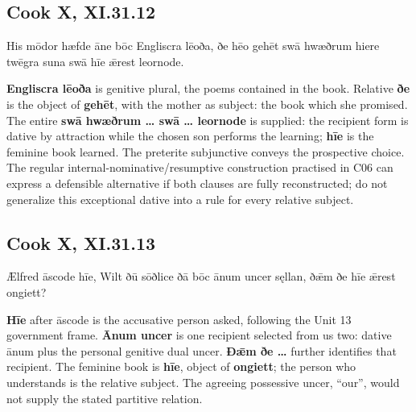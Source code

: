 \subsection*{Cook X, XI.31.12}

\par\begin{minipage}{\linewidth}\raggedright
His mōdor hæfde āne bōc Engliscra lēoða, ðe hēo gehēt swā hwæðrum hiere twēgra suna swā hīe ǣrest leornode.

\textbf{Engliscra lēoða} is genitive plural, the poems contained in the book. Relative \textbf{ðe} is the object of \textbf{gehēt}, with the mother as subject: the book which she promised. The entire \textbf{swā hwæðrum … swā … leornode} is supplied: the recipient form is dative by attraction while the chosen son performs the learning; \textbf{hīe} is the feminine book learned. The preterite subjunctive conveys the prospective choice. The regular internal-nominative/\allowbreak{}resumptive construction practised in C06 can express a defensible alternative if both clauses are fully reconstructed; do not generalize this exceptional dative into a rule for every relative subject.

\end{minipage}\par\addvspace{4pt}

\subsection*{Cook X, XI.31.13}

\par\begin{minipage}{\linewidth}\raggedright
Ælfred āscode hīe, Wilt ðū sōðlice ðā bōc ānum uncer sęllan, ðǣm ðe hīe ǣrest ongiett?

\textbf{Hīe} after āscode is the accusative person asked, following the Unit 13 government frame. \textbf{Ānum uncer} is one recipient selected from us two: dative ānum plus the personal genitive dual uncer. \textbf{Ðǣm ðe …} further identifies that recipient. The feminine book is \textbf{hīe}, object of \textbf{ongiett}; the person who understands is the relative subject. The agreeing possessive uncer, “our”, would not supply the stated partitive relation.

\end{minipage}\par\addvspace{4pt}

